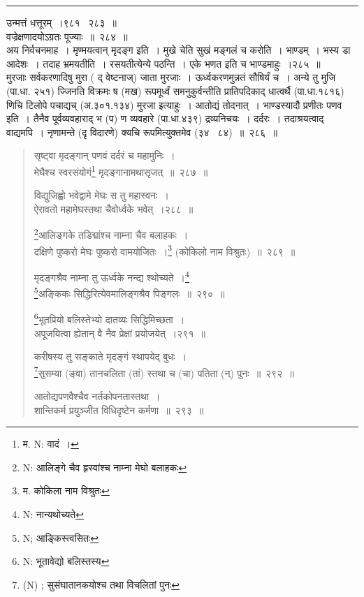 \documentclass[11pt, openany]{book}
\begin{document}
\hrule

\vspace{2mm}
उन्मत्तं धत्तूरम्~।९८१ \textendash\ २८३~॥\\

वज्रेक्षणादयोऽग्रतः पूज्याः~॥~२८४~॥\\

{\qtt अय निर्वचनमाह}~। मृण्मयत्वान् मृदङ्ग इति~। मुखे चेति सुखं मङ्गलं च करोति~। {\qtt भाण्डम्}~। भस्य डा आदेशः~। तदाह भ्रमयतीति~। रसयतीत्येन्ये पठन्ति~। एके भणत इति च भाण्डमाहुः~।२८५~॥\\

मुरजाः सर्वकरणादिषु मुरा ( द् वेष्टनाज्) जाता मुरजाः~। ऊर्ध्वकरणमुन्नतं सौषिर्यं च~। अन्ये तु मुजि (पा.धा. २५१) ज्जिनति विक्रमः ष (मख) रूपमूर्ध्वं समनुकुर्वन्तीति प्रातिपदिकाद् धात्वर्थै  (पा.धा.१८१६) णिचि टिलोपे पचाद्यच् (अ.३०१.१३४) मुरजा इत्याहुः~। आतोद्यं तोदनात्~। भाण्डस्यादौ प्रणीतः पणव इति~। तैनैव पूर्वव्यवहाराद् भ (प) ण व्यवहारे (पा.धा.४३९) द्रव्यनिचयः~। दर्दरः~। तदाश्रयत्वाद् वाद्यमपि~। नृणामन्ते (दृ विदारणे) क्यचि रूपमित्युक्तमेव (३४ \textendash\ ८४)~॥~२८६~॥

\newpage

\begin{quote}
{\na सृष्ट्वा मृदङ्गान् पणवं दर्दरं च महामुनिः~।\\
मेघैश्च स्वरसंयोगं\renewcommand{\thefootnote}{1}\footnote{म. N: वादं~।} मृदङ्गानामथासृजत्~॥~२८७~॥

विद्युजिह्वो भवेद्वामे मेघः स तु महास्वनः~।\\
ऐरावतो महामेघस्तथा चैवोर्ध्वके भवेत्~।२८८~॥

\renewcommand{\thefootnote}{1a}\footnote{N: आलिङ्गे चैव हृस्वांश्च नाम्ना मेघो बलाहकः}आलिङ्गके तडिद्मांश्च नाम्ना चैव बलाहकः~।\\
दक्षिणे पुष्करो मेघः पुष्करो वामयोजितः~।\renewcommand{\thefootnote}{2}\footnote{म. कोकिला नाम विश्रुतः} (कोकिलो नाम विश्रुतः)~॥~२८९~॥

मृदङ्गश्रैव नाम्ना तु ऊर्ध्वके नन्द्य श्थोच्यते~।\renewcommand{\thefootnote}{3}\footnote{N: नान्यथोच्यते}\\
\renewcommand{\thefootnote}{4}\footnote{N; आङ्किस्त्वसितः}अङ्किकः सिद्धिरित्येवमालिङ्गश्रैव पिङ्गलः~॥~२९०~॥

\renewcommand{\thefootnote}{5}\footnote{N: भूतावेद्यो बलिस्तस्य}भूतप्रियो बलिस्तेभ्यो दातव्यः सिद्धिमिच्छता~।\\
अपूजयित्वा ह्येतान् वै नैव प्रेक्षां प्रयोजयेत्~।२९१~॥

करीषस्य तु सङ्काते मृदङ्गं स्थापयेद् बुधः~।\\
\renewcommand{\thefootnote}{6}\footnote{(N) ; सुसंघातानकयोश्च तथा विचलितां पुनः}सुसम्या (ङ्वा) तानचलिता (तां) स्तथा च (चा) पतिता (न्) पुनः~॥~२९२~॥

आतोद्यपणवैश्चैव नर्तकोपनतास्तथा~।\\
शान्तिकर्म प्रयुञ्जीत विधिदृष्टेन कर्मणा~॥~२९३~॥}
\end{quote}
\end{document}
